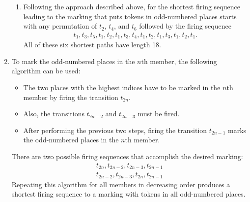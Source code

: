 \documentclass[a4paper,notitlepage]{article}
\begin{document}
\begin{enumerate}[1.]
\begin{enumerate}[1)]
    			\item
    				Following the approach described above, for the shortest firing
    				sequence leading to the marking that puts tokens in odd-numbered places
    				starts with any permutation of $t_2$, $t_4$, and $t_6$ followed by the
    				firing sequence
    				\begin{align*}
    				    t_1, t_3, t_5, t_1, t_2, t_1, t_3, t_4, t_1, t_2, t_1, t_3, t_1, t_2, t_1.
    				\end{align*}
    				All of these six shortest paths have length 18.
    		\end{enumerate}
    	\item
   			To mark the odd-numbered places in the $n$th member, the following
   			algorithm can be used:
   			\begin{itemize}
   				\item
   					The two places with the highest indices have to be marked in the $n$th 
   					member by firing the transition $t_{2n}$.
   				\item
   					Also, the transitions $t_{2n-2}$ and $t_{2n-3}$ must be fired.
   				\item
   					After performing the previous two steps, firing the transition
   					$t_{2n-1}$ marks the odd-numbered places in the $n$th member.
			\end{itemize}   			
			There are two possible firing sequences that accomplish
   			the desired marking:
   			\begin{align*}
   				t_{2n}, t_{2n-2}, t_{2n-3}, t_{2n-1} \\
   				t_{2n-2}, t_{2n-3}, t_{2n}, t_{2n-1}
   			\end{align*}
   			Repeating this algorithm for all members in decreasing order produces a
   			shortest firing sequence to a marking with tokens in all odd-numbered
   			places.
   	\end{enumerate}
\end{document}
